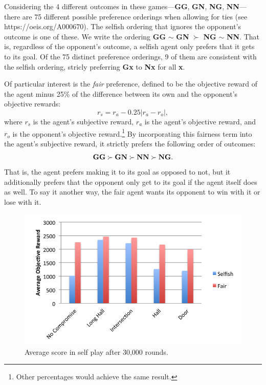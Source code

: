 \documentclass[letterpaper]{article}
\begin{document}

Considering the 4 different outcomes in these games---{\bf GG}, {\bf
GN}, {\bf NG}, {\bf NN}---there are 75 different possible preference
orderings when allowing for ties (see https://oeis.org/A000670). The
selfish ordering that ignores the opponent's outcome is one of
these. We write the ordering {\bf GG} $\sim$ {\bf GN} $\succ$ {\bf NG}
$\sim$ {\bf NN}. That is, regardless of the opponent's outcome, a
selfish agent only prefers that it gets to its goal. Of the 75
distinct preference orderings, 9 of them are consistent with the
selfish ordering, stricly preferring {\bf Gx} to {\bf Nx} for all {\bf
x}.

Of particular interest is the \emph{fair} preference, defined to be
the objective reward of the agent minus 25\% of the difference between
its own and the opponent's objective rewards:
$$r_{s} = r_{a} - 0.25 \left| r_{a} - r_{o} \right|,$$ where $r_{s}$
is the agent's subjective reward, $r_{a}$ is the agent's objective
reward, and $r_{o}$ is the opponent's objective reward.\footnote{Other
percentages would achieve the same result.}  By incorporating this
fairness term into the agent's subjective reward, it strictly prefers
the following order of outcomes:
\begin{equation}
\mbox{\bf GG} \succ \mbox{\bf GN} \succ \mbox {\bf NN} \succ \mbox{\bf
NG}.
\label{e:fair}
\end{equation}
That is, the agent prefers making it to
its goal as opposed to not, but it additionally prefers that the
opponent only get to its goal if the agent itself does as well. To say
it another way, the fair agent wants its opponent to win with it or
lose with it.

\begin{figure}
\centering
\includegraphics[width=0.8\columnwidth]{figures/SelfPlay.png}
\caption{Average score in self play after 30,000 rounds.}
\label{f:selfplay}
\end{figure}
\end{document}
